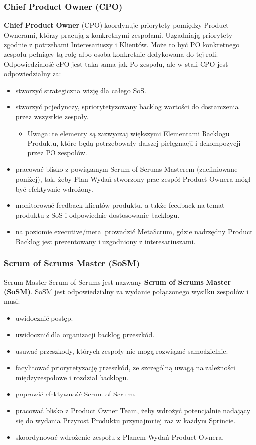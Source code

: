 \documentclass[12pt,a4paper,parskip=full]{scrartcl}
\begin{document}
\subsubsection{Chief Product Owner (CPO)}

\textbf{Chief Product Owner} (CPO) koordynuje priorytety pomiędzy Product Ownerami, którzy pracują z konkretnymi zespołami. Uzgadniają priorytety zgodnie z potrzebami Interesariuszy i Klientów. Może to być PO konkretnego zespołu pełniący tą rolę albo osoba konkretnie dedykowana do tej roli. Odpowiedzialość cPO jest taka sama jak Po zespołu, ale w stali CPO jest odpowiedzialny za:

\begin{itemize}
	\item stworzyć strategiczna wizję dla całego SoS.
	\item stworzyć pojedynczy, spriorytetyzowany backlog wartości do dostarczenia przez wszystkie zespoły.
	\begin{itemize}
		\item Uwaga: te elementy są zazwyczaj większymi Elementami Backlogu Produktu, które będą potrzebowały dalszej pielęgnacji i dekompozycji przez PO zespołów.
	\end{itemize}
	\item pracować blisko z powiązanym Scrum of Scrums Masterem (zdefiniowane poniżej), tak, żeby Plan Wydań stworzony prze zespół Product Ownera mógł być efektywnie wdrożony.
	\item monitorować feedback klientów produktu, a także feedback na temat produktu z SoS i odpowiednie dostosowanie backlogu.
	\item na poziomie executive/meta, prowadzić MetaScrum, gdzie nadrzędny Product Backlog jest prezentowany i uzgodniony z interesariuszami.
\end{itemize}



\subsubsection{Scrum of Scrums Master (SoSM)}

Scrum Master Scrum of Scrums jest nazwany \textbf{Scrum of Scrums Master (SoSM)}. SoSM jest odpowiedzialny za wydanie połączonego wysiłku zespołów i musi:

\begin{itemize}
	\item uwidocznić postęp.  %
	\item uwidocznić dla organizacji backlog przeszkód.
	\item usuwać przeszkody, których zespoły nie mogą rozwiązać samodzielnie.
	\item facylitować priorytetyzację przeszkód, ze szczególną uwagą na zależności międzyzespołowe i rozdział backlogu.
	\item poprawić efektywność Scrum of Scrums.
	\item pracować blisko z Product Owner Team, żeby wdrożyć potencjalnie nadający się do wydania Przyrost Produktu przynajmniej raz w każdym Sprincie.
	\item skoordynować wdrożenie zespołu z Planem Wydań Product Ownera.
\end{itemize}
\end{document}
